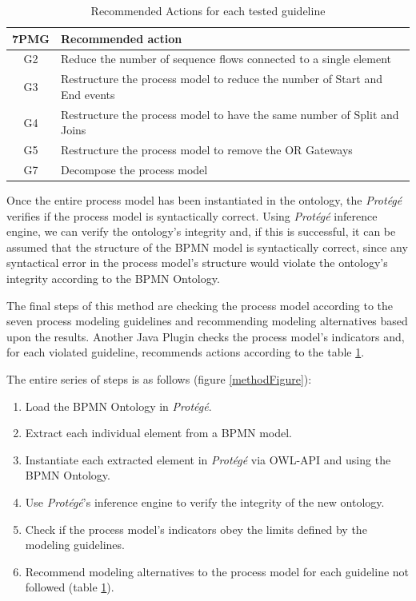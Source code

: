 \documentclass[a4paper,twoside]{article}
\begin{document}
\begin{table}[]
	\centering
	\caption{Recommended Actions for each tested guideline}
	\label{RecommendedActions}
	\begin{tabular}{|c|p{5.5cm}|}
		\hline
		7PMG & Recommended action \\ \hline
		G2 & Reduce the number of sequence flows connected to a single element \\ \hline
		G3 & Restructure the process model to reduce the number of Start and End events \\ \hline
		G4 & Restructure the process model to have the same number of Split and Joins \\ \hline
		G5 & Restructure the process model to remove the OR Gateways \\ \hline
		G7 & Decompose the process model \\ \hline
	\end{tabular}
\end{table}

Once the entire process model has been instantiated in the ontology, the \textit{Protégé}  verifies if the process model is syntactically correct.  Using \textit{Protégé} inference engine, we can verify the ontology's integrity and, if this is successful, it can be assumed that the structure of the BPMN model is syntactically correct, since any syntactical error in the process model's structure would violate the ontology's integrity according to the BPMN Ontology.

The final steps of this method are checking the process model according to the seven process modeling guidelines and recommending modeling alternatives based upon the results. Another Java Plugin checks the process model's indicators and, for each violated guideline, recommends actions according to the table \ref{RecommendedActions}.

The entire series of steps is as follows (figure \ref{methodFigure}):

\begin{enumerate}
	\item Load the BPMN Ontology in \textit{Protégé}.
	\item Extract each individual element from a BPMN model.
	\item Instantiate each extracted element in \textit{Protégé} via OWL-API and using the BPMN Ontology.
	\item Use \textit{Protégé}'s inference engine to verify the integrity of the new ontology.
	\item Check if the process model's indicators obey the limits defined by the modeling guidelines.
	\item Recommend modeling alternatives to the process model for each guideline not followed (table \ref{RecommendedActions}).
\end{enumerate}
\end{document}

